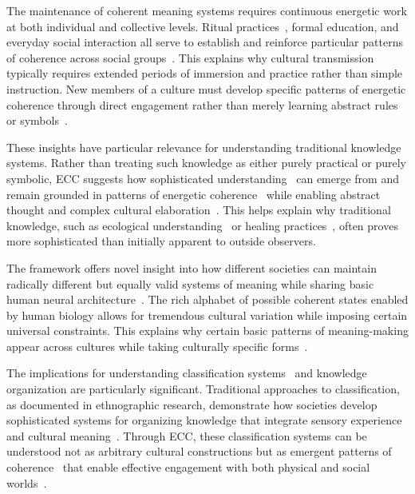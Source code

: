 The maintenance of coherent meaning systems requires continuous energetic work at both individual and collective levels. Ritual practices~, formal education, and everyday social interaction all serve to establish and reinforce particular patterns of coherence across social groups~\cite{hutchins1995cognition}. This explains why cultural transmission~ typically requires extended periods of immersion and practice rather than simple instruction. New members of a culture must develop specific patterns of energetic coherence through direct engagement rather than merely learning abstract rules or symbols~\cite{tomasello1999cultural}.

These insights have particular relevance for understanding traditional knowledge systems. Rather than treating such knowledge as either purely practical or purely symbolic, ECC suggests how sophisticated understanding~ can emerge from and remain grounded in patterns of energetic coherence~ while enabling abstract thought and complex cultural elaboration~\cite{tsing2015mushroom}. This helps explain why traditional knowledge, such as ecological understanding~ or healing practices~, often proves more sophisticated than initially apparent to outside observers.

The framework offers novel insight into how different societies can maintain radically different but equally valid systems of meaning while sharing basic human neural architecture~\cite{merleau1962phenomenology}. The rich alphabet of possible coherent states enabled by human biology allows for tremendous cultural variation while imposing certain universal constraints. This explains why certain basic patterns of meaning-making appear across cultures while taking culturally specific forms~\cite{strathern2004partial}.

The implications for understanding classification systems~ and knowledge organization are particularly significant. Traditional approaches to classification, as documented in ethnographic research, demonstrate how societies develop sophisticated systems for organizing knowledge that integrate sensory experience~ and cultural meaning~\cite{ellen2016cultural}. Through ECC, these classification systems can be understood not as arbitrary cultural constructions but as emergent patterns of coherence~ that enable effective engagement with both physical and social worlds~\cite{levi1966savage}.

